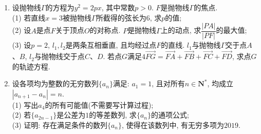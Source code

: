 \documentclass[10pt,a4paper]{article}
\begin{document}
\begin{enumerate}[1.]
\item 设抛物线$\Gamma$的方程为$y^2=2px$, 其中常数$p>0$. $F$是抛物线$\Gamma$的焦点.\\
(1) 若直线$x=3$被抛物线$\Gamma$所截得的弦长为$6$, 求$p$的值;\\
(2) 设$A$是点$F$关于顶点$O$的对称点. $P$是抛物线$\Gamma$上的动点, 求$\dfrac{|PA|}{|PF|}$的最大值;\\
(3) 设$p=2$, $l_1,l_2$是两条互相垂直, 且均经过点$F$的直线. $l_1$与抛物线$\Gamma$交于点$A$、$B$, $l_2$与抛物线交于点$C$、$D$. 若点$G$满足$4\overrightarrow{FG}=\overrightarrow{FA}+\overrightarrow{FB}+\overrightarrow{FC}+\overrightarrow{FD}$, 求点$G$的轨迹方程.
\item 设各项均为整数的无穷数列$\{a_n\}$满足: $a_1=1$, 且对所有$n\in \mathbf{N}^*$, 均成立$|a_{n+1}-a_n|=n$.\\
(1) 写出$a_4$的所有可能值(不需要写计算过程);\\
(2) 若$\{a_{2n-1}\}$是公差为$1$的等差数列, 求$\{{a_n}\}$的通项公式;\\
(3) 证明: 存在满足条件的数列$\{a_n\}$, 使得在该数列中, 有无穷多项为$2019$.



\end{enumerate}
\end{document}
